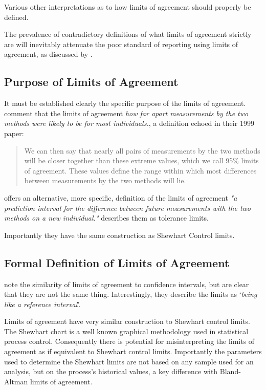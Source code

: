 \documentclass[12pt, a4paper]{report}
\theoremstyle{plain}
\theoremstyle{definition}
\theoremstyle{remark}
\begin{document}
Various other interpretations as to how limits of agreement should properly be defined. 

The prevalence of contradictory definitions of what limits of agreement strictly are will inevitably attenuate the poor standard of reporting using limits of agreement, as discussed by \citet{mantha}.


\subsection{Purpose of Limits of Agreement} It must be established
clearly the specific purpose of the limits of agreement.
\citet*{BA95} comment that the limits of agreement \emph{how far
	apart measurements by the two methods were likely to be for most
	individuals.}, a definition echoed in their 1999 paper:
\begin{quote} We can then say that nearly all pairs
	of measurements by the two methods will be closer together than
	these extreme values, which we call 95\% limits of agreement.
	These values define the range within which most differences
	between measurements by the two methods will lie\citep{BA99}.
\end{quote}
\citet{BXC} offers an alternative, more specific,  definition of
the limits of agreement \emph{"a prediction interval for the
	difference between future measurements with the two methods on a
	new individual."} \citet{luiz} describes them as tolerance limits.

Importantly they have the same construction as Shewhart Control
limits.


\subsection{Formal Definition of Limits of Agreement}
\citet{BA99} note the similarity of limits of agreement to
confidence intervals, but are clear that they are not the same thing. Interestingly, they describe the limits as `\textit{being like a reference interval}'.

Limits of agreement have very similar construction to Shewhart control limits. The Shewhart chart is a well known graphical
methodology used in statistical process control. Consequently there is potential for misinterpreting the limits of agreement as if equivalent to Shewhart control limits. Importantly the
parameters used to determine the Shewhart limits are not based on any sample used for an analysis, but
on the process's historical values, a key difference with
Bland-Altman limits of agreement.
\end{document}
